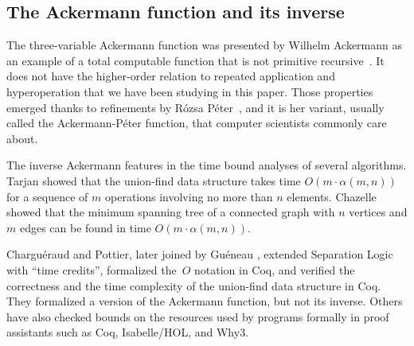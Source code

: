 \subsection{The Ackermann function and its inverse}
The three-variable Ackermann function was presented by
Wilhelm Ackermann as an example of a total computable function that
is not primitive recursive~\cite{ackermann}.
It does not have the higher-order
relation to repeated application and hyperoperation that we have been studying in
this paper. Those properties emerged thanks to refinements by Rózsa Péter~\cite{peter},
and it is her variant, usually called the Ackermann-Péter function, 
that computer scientists commonly care about.

The inverse Ackermann
features in the time bound analyses of several algorithms.
Tarjan \cite{tarjan} showed that the union-find data structure
takes time $O(m\cdot\alpha(m,n))$ for a sequence of $m$ operations
involving no more than $n$ elements. 
Chazelle \cite{chazelle} showed that the minimum spanning tree
of a connected graph with $n$ vertices and $m$ edges
can be found in time $O(m\cdot\alpha(m,n))$.

Charguéraud and Pottier, later joined by Guéneau \cite{charpott,gueneauetal},
extended Separation Logic with ``time credits'',
formalized the~$O$ notation in Coq,
and verified the correctness
and the time complexity of the union-find data structure in Coq.
They formalized a version of the Ackermann function, but not its inverse. 
Others \cite{others2,others4,others3,others1}
have also checked bounds on the resources
used by programs formally in proof assistants such as Coq, Isabelle/HOL, and Why3.

